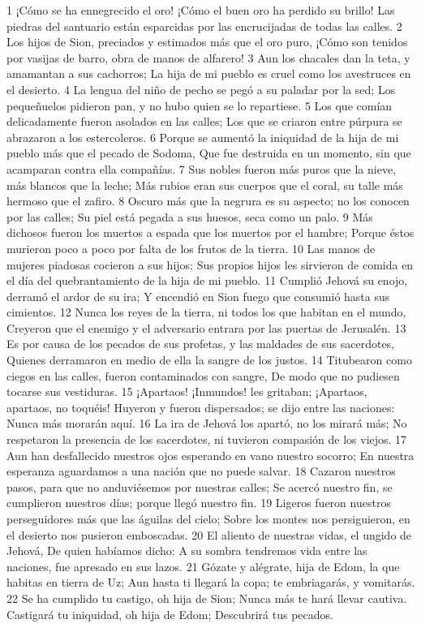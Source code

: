 1 ¡Cómo se ha ennegrecido el oro!
¡Cómo el buen oro ha perdido su brillo!
Las piedras del santuario están esparcidas por las encrucijadas de todas las calles.
2 Los hijos de Sion, preciados y estimados más que el oro puro,
¡Cómo son tenidos por vasijas de barro, obra de manos de alfarero!
3 Aun los chacales dan la teta, y amamantan a sus cachorros;
La hija de mi pueblo es cruel como los avestruces en el desierto.
4 La lengua del niño de pecho se pegó a su paladar por la sed;
Los pequeñuelos pidieron pan, y no hubo quien se lo repartiese.
5 Los que comían delicadamente fueron asolados en las calles;
Los que se criaron entre púrpura se abrazaron a los estercoleros.
6 Porque se aumentó la iniquidad de la hija de mi pueblo más que el pecado de Sodoma, 
Que fue destruida en un momento, sin que acamparan contra ella compañías.
7 Sus nobles fueron más puros que la nieve, más blancos que la leche;
Más rubios eran sus cuerpos que el coral, su talle más hermoso que el zafiro.
8 Oscuro más que la negrura es su aspecto; no los conocen por las calles;
Su piel está pegada a sus huesos, seca como un palo.
9 Más dichosos fueron los muertos a espada que los muertos por el hambre;
Porque éstos murieron poco a poco por falta de los frutos de la tierra.
10 Las manos de mujeres piadosas cocieron a sus hijos; 
Sus propios hijos les sirvieron de comida en el día del quebrantamiento de la hija de mi pueblo.
11 Cumplió Jehová su enojo, derramó el ardor de su ira;
Y encendió en Sion fuego que consumió hasta sus cimientos.
12 Nunca los reyes de la tierra, ni todos los que habitan en el mundo,
Creyeron que el enemigo y el adversario entrara por las puertas de Jerusalén.
13 Es por causa de los pecados de sus profetas, y las maldades de sus sacerdotes,
Quienes derramaron en medio de ella la sangre de los justos.
14 Titubearon como ciegos en las calles, fueron contaminados con sangre,
De modo que no pudiesen tocarse sus vestiduras.
15 ¡Apartaos! ¡Inmundos! les gritaban; ¡Apartaos, apartaos, no toquéis!
Huyeron y fueron dispersados; se dijo entre las naciones:
Nunca más morarán aquí.
16 La ira de Jehová los apartó, no los mirará más;
No respetaron la presencia de los sacerdotes, ni tuvieron compasión de los viejos.
17 Aun han desfallecido nuestros ojos esperando en vano nuestro socorro;
En nuestra esperanza aguardamos a una nación que no puede salvar.
18 Cazaron nuestros pasos, para que no anduviésemos por nuestras calles;
Se acercó nuestro fin, se cumplieron nuestros días; porque llegó nuestro fin.
19 Ligeros fueron nuestros perseguidores más que las águilas del cielo;
Sobre los montes nos persiguieron, en el desierto nos pusieron emboscadas.
20 El aliento de nuestras vidas, el ungido de Jehová,
De quien habíamos dicho: A su sombra tendremos vida entre las naciones, fue apresado en sus lazos.
21 Gózate y alégrate, hija de Edom, la que habitas en tierra de Uz;
Aun hasta ti llegará la copa; te embriagarás, y vomitarás.
22 Se ha cumplido tu castigo, oh hija de Sion;
Nunca más te hará llevar cautiva.
Castigará tu iniquidad, oh hija de Edom;
Descubrirá tus pecados.

